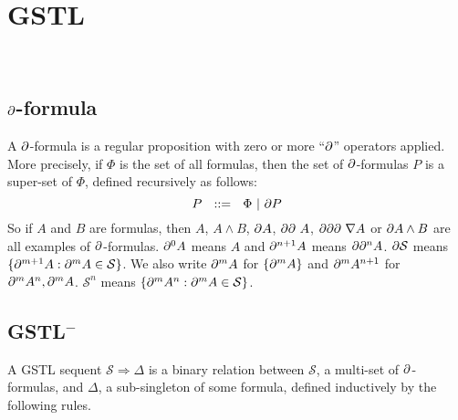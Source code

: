 \section{GSTL}‌\\

\subsection{$\partial$-formula}
A $\partial$-formula is a regular proposition with zero or more ``$\partial$'' operators applied. More precisely, if $\Phi$ is the set of all formulas, then the set of $\partial$-formulas $P$ is a super-set of $\Phi$, defined recursively as follows:
\[ P ~~::=~~ \Phi ~|~ \partial P \]
So if $A$ and $B$ are formulas, then $A$, $A \land B$, $\partial A$, $\partial \partial ~ A$, $\partial \partial \partial ~ \nabla A$ or $\partial A \land B$ are all examples of $\partial$-formulas. $\partial^0 A$ means $A$ and $\partial^{n+1} A$ means $\partial \partial^n A$. $\partial \mathcal{S}$ means $\{\partial^{m+1} A : \partial^m A \in \mathcal{S}\}$. We also write $\partial^m A$ for $\{ \partial^m A \}$ and $\partial^m A^{n+1}$ for $\partial^m A^n,\partial^m A$. $\mathcal{S}^n$ means $\{ \partial^m A^n : \partial^m A \in \mathcal{S} \}$.

\subsection{GSTL$^-$} A GSTL sequent $\mathcal{S} \Rightarrow \Delta$ is a binary relation between $\mathcal{S}$, a multi-set of $\partial$-formulas, and $\Delta$, a sub-singleton of some formula, defined inductively by the following rules.

